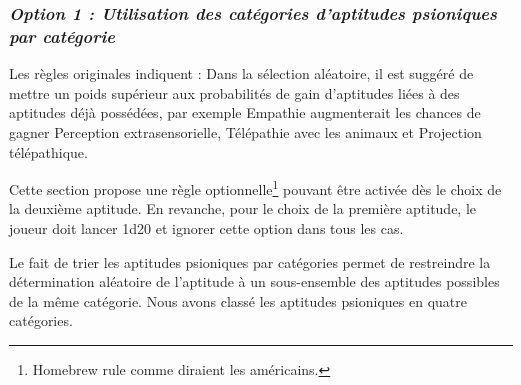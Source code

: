 \subsubsection*{\textit{Option 1 : Utilisation des catégories d'aptitudes psioniques par catégorie}}

Les règles originales indiquent : \og Dans la sélection aléatoire, il est suggéré de mettre un poids supérieur aux probabilités de gain d’aptitudes liées à des aptitudes déjà possédées, par exemple Empathie augmenterait les chances de gagner Perception extrasensorielle, Télépathie avec les animaux et Projection télépathique\fg{}.

\bigskip

Cette section propose une règle optionnelle\footnote{\og Homebrew rule \fg{} comme diraient les américains.} pouvant être activée dès le choix de la deuxième aptitude. En revanche, pour le choix de la première aptitude, le joueur doit lancer 1d20 et ignorer cette option dans tous les cas.

\bigskip

Le fait de trier les aptitudes psioniques par catégories permet de restreindre la détermination aléatoire de l'aptitude à un sous-ensemble des aptitudes possibles de la même catégorie. Nous avons classé les aptitudes psioniques en quatre catégories.

\bigskip

